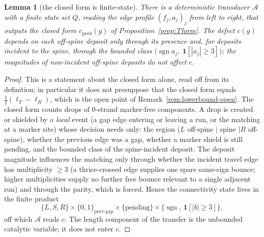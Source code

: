 \documentclass[11pt]{article}
\theoremstyle{plain}
\newtheorem{lemma}[theorem]{Lemma}
\theoremstyle{definition}
\theoremstyle{remark}
\begin{document}
\begin{lemma}[the closed form is finite-state]
\label{lem:fsm}
There is a deterministic transducer $\mathcal{A}$ with a finite state set $Q$,
reading the edge profile $(f_j,a_j)_j$ from left to right, that outputs the
closed form $c_{\mathrm{pred}}(g)$ of Proposition~\textup{\ref{prop:Tform}}.
The defect $c(g)$ depends on each off-spine deposit only through its presence
and, for deposits incident to the spine, through the bounded class
$\bigl(\operatorname{sgn}a_j,\ \mathbf{1}[|a_j|\ge3]\bigr)$; the magnitudes of
non-incident off-spine deposits do not affect $c$.
\end{lemma}

\begin{proof}
This is a statement about the closed form alone, read off from its definition;
in particular it does not presuppose that the closed form equals
$\tfrac12(\ell_T-\ell_R)$, which is the open point of
Remark~\textup{\ref{rem:lowerbound-open}}. The closed form counts drops of
$0$-strand marker-free components. A drop is created or shielded by a
\emph{local} event (a gap edge entering or leaving a run, or the matching at
a marker site) whose decision needs only: the region
($L$ off-spine $\mid$ spine $\mid R$ off-spine), whether the previous edge was a
gap, whether a marker shield is still pending, and the bounded class of the
spine-incident deposit. The deposit magnitude influences the matching only
through whether the incident travel edge has multiplicity $\ge3$ (a
thrice-crossed edge supplies one spare same-sign bounce; higher multiplicities
supply no further free bounce relevant to a single adjacent run) and through the
parity, which is forced. Hence the connectivity state lives in the finite
product
\[
\{L,S,R\}\times\{0,1\}_{\text{prev-gap}}\times\{\text{pending}\}
\times\{\operatorname{sgn},\,\mathbf 1[|b|\ge3]\},
\]
off which $\mathcal{A}$ reads $c$. The length component of the transfer is the
unbounded catalytic variable; it does not enter $c$.
\end{proof}
\end{document}
